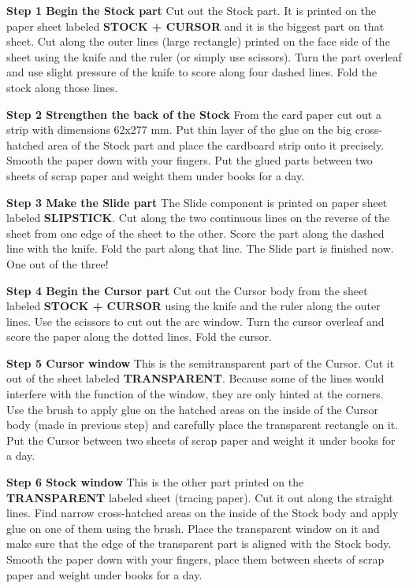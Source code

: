 \documentclass[a4paper,9pt]{article}
\begin{document}
\begin{multicols*}{3}
{  \textbf{Step 1 Begin the Stock part} Cut out the Stock part. It is printed on the paper sheet labeled \textbf{STOCK + CURSOR} and it is the biggest part on that sheet. Cut along the outer lines (large rectangle) printed on the face side of the sheet using the knife and the ruler (or simply use scissors). Turn the part overleaf and use slight pressure of the knife to score along four dashed lines. Fold the stock along those lines.

  \textbf{Step 2 Strengthen the back of the Stock} From the card paper cut out a strip with dimensions 62x277 mm. Put thin layer of the glue on the big cross-hatched area of the Stock part and place the cardboard strip onto it precisely. Smooth the paper down with your fingers. Put the glued parts between two sheets of scrap paper and weight them under books for a day.

  \textbf{Step 3 Make the Slide part} The Slide component is printed on paper sheet labeled \textbf{SLIPSTICK}. Cut along the two continuous lines on the reverse of the sheet from one edge of the sheet to the other. Score the part along the dashed line with the knife. Fold the part along that line. The Slide part is finished now. One out of the three!

  \textbf{Step 4 Begin the Cursor part} Cut out the Cursor body from the sheet labeled \textbf{STOCK + CURSOR} using the knife and the ruler along the outer lines. Use the scissors to cut out the arc window. Turn the cursor overleaf and score the paper along the dotted lines. Fold the cursor.

  \textbf{Step 5 Cursor window} This is the semitransparent part of the Cursor. Cut it out of the sheet labeled \textbf{TRANSPARENT}. Because some of the lines would interfere with the function of the window, they are only hinted at the corners. Use the brush to apply glue on the hatched areas on the inside of the Cursor body (made in previous step) and carefully place the transparent rectangle on it. Put the Cursor between two sheets of scrap paper and weight it under books for a day.

  \textbf{Step 6 Stock window} This is the other part printed on the \textbf{TRANSPARENT} labeled sheet (tracing paper). Cut it out along the straight lines. Find narrow cross-hatched areas on the inside of the Stock body and apply glue on one of them using the brush. Place the transparent window on it and make sure that the edge of the transparent part is aligned with the Stock body. Smooth the paper down with your fingers, place them between sheets of scrap paper and weight under books for a day.

}
\end{multicols*}
\end{document}
